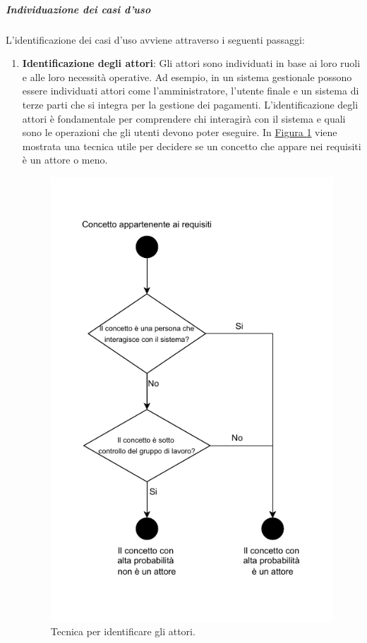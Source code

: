 \subparagraph{Individuazione dei casi d'uso}
L'identificazione dei casi d'uso avviene attraverso i seguenti passaggi:
\begin{enumerate}
    \item \textbf{Identificazione degli attori}: Gli attori sono individuati in base ai loro ruoli e alle loro necessità operative. 
    Ad esempio, in un sistema gestionale possono essere individuati attori come l'amministratore, l'utente finale e un sistema di terze parti che si integra per la gestione dei pagamenti.
    L'identificazione degli attori è fondamentale per comprendere chi interagirà con il sistema e quali sono le operazioni che gli utenti devono poter eseguire.
    In \hyperref[fig:identificare_attori]{Figura \ref{fig:identificare_attori}} viene mostrata una tecnica utile per decidere se un concetto che appare nei requisiti è un attore o meno.
    \begin{figure}[!h]
        \centering
        \includegraphics{Sezioni/ProcessiPrimari/Immagini/tecnica_casi_uso.pdf}
        \caption{Tecnica per identificare gli attori.}
        \label{fig:identificare_attori}
    \end{figure} 


\end{enumerate}
